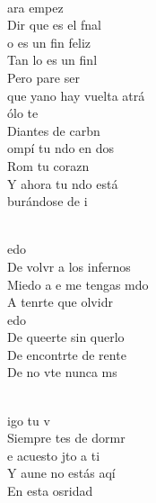 \begin{cancion}[Miedo][M Clan]%
	    \\
	ara empez\\
	Dir que es el fnal\\
	o es un fin feliz\\
	Tan lo es un finl \\
	Pero pare ser \\
	que yano hay vuelta atrá    \\
\jump
	ólo te \\
	Diantes de carbn \\
	ompí tu ndo en dos\\
	Rom tu corazn  \\
	Y ahora tu ndo está\\
	burándose de i       \\\jump\\
	\begin{chorus}%
	edo\\
	De volvr a los infernos\\
	Miedo a e me tengas mdo\\
	A tenrte que olvidr      \\
	edo\\
	De queerte sin querlo\\
	De encontrte de rente\\
	De no vte nunca ms \\
	\end{chorus}%
	\jump\\
	igo tu v\\
	Siempre tes de dormr\\
	e acuesto jto a ti\\
	Y aune no estás aqí\\
	En esta osridad \\

\end{cancion}
